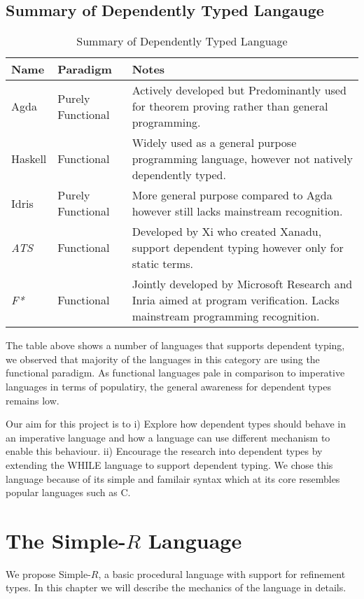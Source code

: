 \documentclass[a4paper,12pt]{report}
\begin{document}
\section{Summary of Dependently Typed Langauge}
\begin{table} [H]
  \begin{tabular}{|p{2cm}|p{2cm}|p{10cm}|}
    \hline
    \textbf{Name} & \textbf{Paradigm} & \textbf{Notes} \\ 
    \hline
    Agda & Purely Functional & Actively developed but 
      Predominantly used for theorem proving rather than general programming. \\ 
    \hline
    Haskell & Functional & Widely used as a general purpose programming language, however not natively dependently typed. \\ 
    \hline
    Idris & Purely Functional & More general purpose compared to Agda however 
      still lacks mainstream recognition. \\
    \hline
    \textit{ATS} \cite{ATS} & Functional & Developed by Xi who created Xanadu, 
      support dependent typing however only for static terms. \\
    \hline
    \textit{F*} \cite{FStar} & Functional & Jointly developed by Microsoft 
    Research and Inria aimed at program verification. Lacks mainstream 
    programming recognition.\\
    \hline
  \end{tabular}
  \caption{Summary of Dependently Typed Language}
\end{table}

\par
The table above shows a number of languages that supports dependent typing, we 
observed that majority of the languages in this category are using the 
functional paradigm. As functional languages pale in comparison to imperative 
languages in terms of populatiry, the general awareness for dependent types 
remains low. 

\par
Our aim for this project is to i) Explore how dependent types should behave in 
an imperative language and how a language can use different mechanism to enable 
this behaviour. ii) Encourage the research into dependent types by extending the 
WHILE language \cite{whileLanguage} to support dependent typing. We chose this 
language because of its simple and familair syntax which at its core resembles 
popular languages such as C. 

\chapter{The Simple-$R$ Language}
We propose Simple-$R$, a basic procedural language with support for refinement 
types. In this chapter we will describe the mechanics of the language in details.
\end{document}
